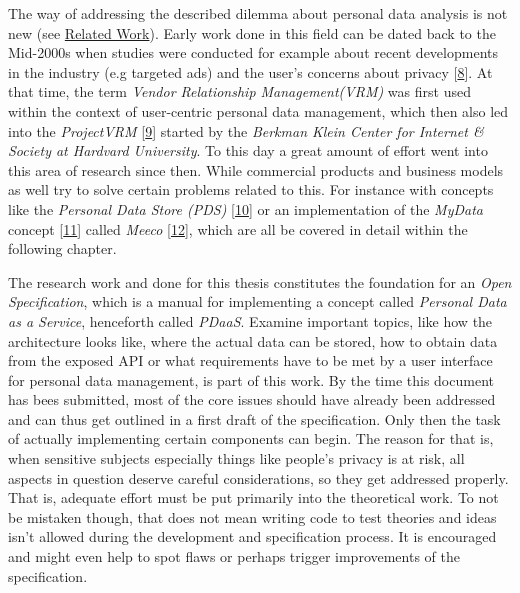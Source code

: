 \documentclass[12pt,english,a4paper,titlepage,cleardoublepage=empty,dottedtoc]{report}
\begin{document}
The way of addressing the described dilemma about personal data analysis
is not new (see \protect\hyperlink{related-work}{Related Work}). Early
work done in this field can be dated back to the Mid-2000s when studies
were conducted for example about recent developments in the industry
(e.g targeted ads) and the user's concerns about privacy
{[}\protect\hyperlink{ref-study_2004_architecture-for-privacy-sensitive-ubiquitous-computing}{8}{]}.
At that time, the term \emph{Vendor Relationship Management(VRM)} was
first used within the context of user-centric personal data management,
which then also led into the \emph{ProjectVRM}
{[}\protect\hyperlink{ref-web_2010_projectvrm_about}{9}{]} started by
the \emph{Berkman Klein Center for Internet \& Society at Hardvard
University}. To this day a great amount of effort went into this area of
research since then. While commercial products and business models as
well try to solve certain problems related to this. For instance with
concepts like the \emph{Personal Data Store (PDS)}
{[}\protect\hyperlink{ref-paper_2013_the-personal-data-store-approach-to-personal-data-security_2013}{10}{]}
or an implementation of the \emph{MyData} concept
{[}\protect\hyperlink{ref-whitepaper_2014_mydata-a-nordic-model-for-human-centered-personal-data-management-and-processing}{11}{]}
called \emph{Meeco}
{[}\protect\hyperlink{ref-web_2016_meeco-how-it-works}{12}{]}, which are
all be covered in detail within the following chapter.

The research work and done for this thesis constitutes the foundation
for an \emph{Open Specification}, which is a manual for implementing a
concept called \emph{Personal Data as a Service}, henceforth called
\emph{PDaaS}. Examine important topics, like how the architecture looks
like, where the actual data can be stored, how to obtain data from the
exposed API or what requirements have to be met by a user interface for
personal data management, is part of this work. By the time this
document has bees submitted, most of the core issues should have already
been addressed and can thus get outlined in a first draft of the
specification. Only then the task of actually implementing certain
components can begin. The reason for that is, when sensitive subjects
especially things like people's privacy is at risk, all aspects in
question deserve careful considerations, so they get addressed properly.
That is, adequate effort must be put primarily into the theoretical
work. To not be mistaken though, that does not mean writing code to test
theories and ideas isn't allowed during the development and
specification process. It is encouraged and might even help to spot
flaws or perhaps trigger improvements of the specification.
\end{document}
